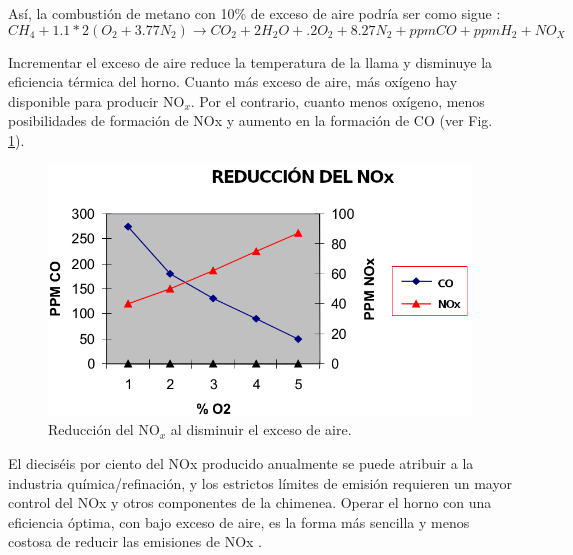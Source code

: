\par Así, la combustión de metano con 10\% de exceso de aire podría ser como sigue \cite{bib:thermox}:
\begin{equation}
CH_4 + 1.1*2(O_2 + 3.77N_2) \rightarrow CO_2 + 2H_2O + .2O_2 + 8.27N_2 + ppmCO + ppmH_2 + NO_X\end{equation}
\par Incrementar el exceso de aire reduce la temperatura de la llama y disminuye la eficiencia térmica del horno. Cuanto más exceso de aire, más oxígeno hay disponible para producir NO$_x$. Por el contrario, cuanto menos oxígeno, menos posibilidades de formación de NOx y aumento en la formación de CO (ver Fig. \ref{fig:nox}).
\begin{figure}[hbt]
\begin{center}
\includegraphics[scale=0.5]{images/nox}
\caption[Reducción del NO$_x$ al disminuir el exceso de aire de combustión]{Reducción del NO$_x$ al disminuir el exceso de aire.\cite{bib:thermox}}
\label{fig:nox}
\end{center}
\end{figure}
\par El dieciséis por ciento del NOx producido anualmente se puede atribuir a la industria química/refinación, y los estrictos límites de emisión requieren un mayor control del NOx y otros componentes de la chimenea. Operar el horno con una eficiencia óptima, con bajo exceso de aire, es la forma más sencilla y menos costosa de reducir las emisiones de NOx \cite{bib:thermox}.

